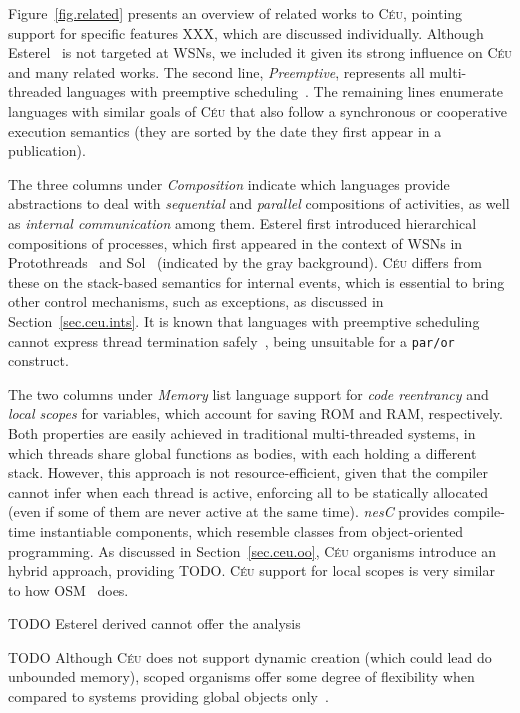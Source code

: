 \documentclass[10pt]{sensys-proc}
\newcommand{\CEU}{\textsc{C\'{e}u}\xspace}
\newcommand{\code}[1] {{\small{\texttt{#1}}}}
\begin{document}
Figure~\ref{fig.related} presents an overview of related works to \CEU, 
pointing support for specific features XXX, which are discussed individually.
Although Esterel~\cite{esterel.ieee91} is not targeted at WSNs, we included it 
given its strong influence on \CEU and many related works.
The second line, \emph{Preemptive}, represents all multi-threaded languages 
with preemptive scheduling~\cite{wsn.mantisos,Y,Z}.
The remaining lines enumerate languages with similar goals of \CEU that also 
follow a synchronous or cooperative execution semantics (they are sorted by the 
date they first appear in a publication).

The three columns under \emph{Composition} indicate which languages provide
abstractions to deal with \emph{sequential} and \emph{parallel} compositions of 
activities, as well as \emph{internal communication} among them.
Esterel first introduced hierarchical compositions of processes, which first 
appeared in the context of WSNs in Protothreads~\cite{wsn.protothreads} and 
Sol~\cite{wsn.sol} (indicated by the gray background).
\CEU differs from these on the stack-based semantics for internal events, which 
is essential to bring other control mechanisms, such as exceptions, as 
discussed in Section~\ref{sec.ceu.ints}.
It is known that languages with preemptive scheduling cannot express thread 
termination safely~\cite{esterel.preemption,sync_async.threadsstop}, being 
unsuitable for a \code{par/or} construct.

The two columns under \emph{Memory} list language support for \emph{code 
reentrancy} and \emph{local scopes} for variables, which account for saving ROM 
and RAM, respectively.
Both properties are easily achieved in traditional multi-threaded systems, in 
which threads share global functions as bodies, with each holding a different 
stack.
However, this approach is not resource-efficient, given that the compiler 
cannot infer when each thread is active, enforcing all to be statically 
allocated~\cite{wsn.mantisos,wsn.ocram} (even if some of them are never active 
at the same time).
\emph{nesC} provides compile-time instantiable components, which resemble 
classes from object-oriented programming.
As discussed in Section~\ref{sec.ceu.oo}, \CEU organisms introduce an hybrid 
approach, providing TODO.
\CEU support for local scopes is very similar to how OSM~\cite{wsn.osm} does.

TODO
Esterel derived cannot offer the analysis

TODO
Although \CEU does not support dynamic creation (which could lead do unbounded 
memory), scoped organisms offer some degree of flexibility when compared to 
systems providing global objects only~\cite{wsn.virgil,wsn.flowtalk}.
\end{document}
